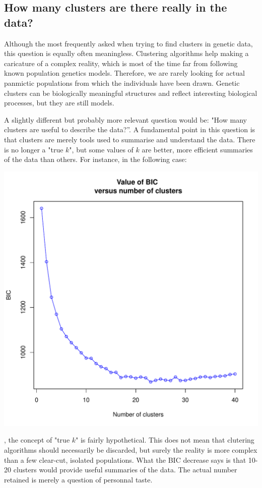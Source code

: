 \documentclass{article}
\begin{document}
\subsection{How many clusters are there really in the data?}

Although the most frequently asked when trying to find clusters in genetic data, this question is
equally often meaningless. Clustering algorithms help making a caricature of a complex reality,
which is most of the time far from following known population genetics models. Therefore, we are
rarely looking for actual panmictic populations from which the individuals have been drawn. Genetic
clusters can be biologically meaningful structures and reflect interesting biological processes, but
they are still models.

A slightly different but probably more relevant question would be: "How many clusters are useful to
describe the data?''. A fundamental point in this question is that clusters are merely tools used to
summarise and understand the data. There is no longer a "true $k$", but some values of $k$ are
better, more efficient summaries of the data than others.
For instance, in the following case:
\begin{center}
  \includegraphics[width=.7\textwidth]{figs/findclust-noclearcut.pdf}
\end{center}

\noindent , the concept of "true $k$" is fairly hypothetical. This does not mean that clutering
algorithms should necessarily be discarded, but surely the reality is more complex than a few
clear-cut, isolated populations. What the BIC decrease says is that 10-20 clusters would provide useful
summaries of the data. The actual number retained is merely a question of personnal taste.
\end{document}
